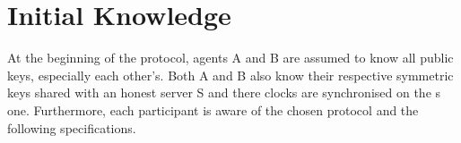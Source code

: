 \section{Initial Knowledge}
At the beginning of the protocol, agents A and B are assumed to know all public keys, especially each other’s. Both A and B also know their respective symmetric keys shared with an honest server S and there clocks are synchronised on the s one. Furthermore, each participant is aware of the chosen protocol and the following specifications.